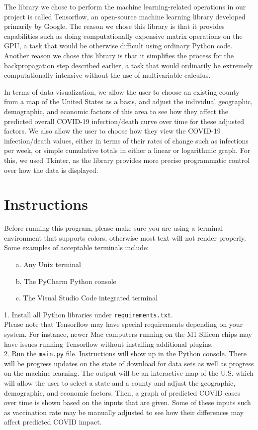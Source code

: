 \documentclass[fontsize=11pt]{article}
\begin{document}
    The library we chose to perform the machine learning-related operations in our project is called Tensorflow, an open-source machine learning library developed primarily by Google. The reason we chose this library is that it provides capabilities such as doing computationally expensive matrix operations on the GPU, a task that would be otherwise difficult using ordinary Python code. Another reason we chose this library is that it simplifies the process for the backpropagation step described earlier, a task that would ordinarily be extremely computationally intensive without the use of multivariable calculus. \par

    In terms of data visualization, we allow the user to choose an existing county from a map of the United States as a basis, and adjust the individual geographic, demographic, and economic factors of this area to see how they affect the predicted overall COVID-19 infection/death curve over time for these adjusted factors. We also allow the user to choose how they view the COVID-19 infection/death values, either in terms of their rates of change such as infections per week, or simple cumulative totals in either a linear or logarithmic graph. For this, we used Tkinter, as the library provides more precise programmatic control over how the data is displayed.


    \section*{Instructions}
    Before running this program, please make sure you are using a terminal environment that supports colors, otherwise most text will not render properly. Some examples of acceptable terminals include:
    \begin{enumerate}
        \item[a.] Any Unix terminal
        \item[b.] The PyCharm Python console
        \item[c.] The Visual Studio Code integrated terminal
    \end{enumerate}
    1. Install all Python libraries under
    \verb_requirements.txt_.\\ Please note that Tensorflow may have special requirements depending on your system. For instance, newer Mac computers running on the M1 Silicon chips may have issues running Tensorflow without installing additional plugins. \\
    2. Run the \verb_main.py_ file. Instructions will show up in the Python console. There will be progress updates on the state of download for data sets as well as progress on the machine learning. The output will be an interactive map of the U.S. which will allow the user to select a state and a county and adjust the geographic, demographic, and economic factors. Then, a graph of predicted COVID cases over time is shown based on the inputs that are given. Some of these inputs such as vaccination rate may be manually adjusted to see how their differences may affect predicted COVID impact.
\end{document}

